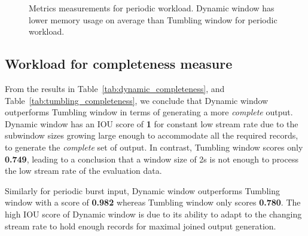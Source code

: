 \begin{figure}
    \caption[Metrics measurements for periodic workload]
    {Metrics measurements for periodic workload. Dynamic window 
    has lower memory usage on average than Tumbling window for
periodic workload. }%
    \label{fig:periodic_measurement}
\end{figure}

\subsection{Workload for completeness measure}%
\label{sec:Workload for completeness measure}

From the results in Table~\ref{tab:dynamic_completeness}, and 
Table~\ref{tab:tumbling_completeness}, we conclude that Dynamic window 
outperforms Tumbling window in terms of generating a more \emph{complete} output. 
Dynamic window has an IOU score of \textbf{1} for constant low stream rate
due to the subwindow sizes growing large 
enough to accommodate all the required records, to generate the \emph{complete} set 
of output. In contrast, Tumbling window scores only \textbf{0.749}, leading to 
a conclusion that a window size of 2s is not enough to process the low stream rate 
of the evaluation data. 

Similarly for periodic burst input, Dynamic window outperforms Tumbling window with a
score of \textbf{0.982} whereas Tumbling window only scores \textbf{0.780}. The high IOU 
score of Dynamic window is due to its ability  
to adapt to the changing stream rate to hold enough 
records for maximal joined output generation.


\begin{table}[htbp]
    \centering
\caption{Dynamic window's completeness measurement.}
\label{tab:dynamic_completeness}
\end{table}

\begin{table}[htbp]
    \centering
\caption{Tumbling window's completeness measurement. }
\label{tab:tumbling_completeness}
\end{table}


